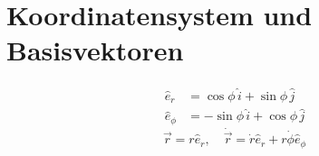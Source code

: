 \section{Koordinatensystem und Basisvektoren}
\[
\begin{aligned}
\hat{e}_r &= \cos\phi\,\hat{i} + \sin\phi\,\hat{j} \\
\hat{e}_\phi &= -\sin\phi\,\hat{i} + \cos\phi\,\hat{j}
\end{aligned}
\]
\[
\vec{r} = r\hat{e}_r, \quad \dot{\vec{r}} = \dot{r}\hat{e}_r + r\dot{\phi}\hat{e}_\phi
\]